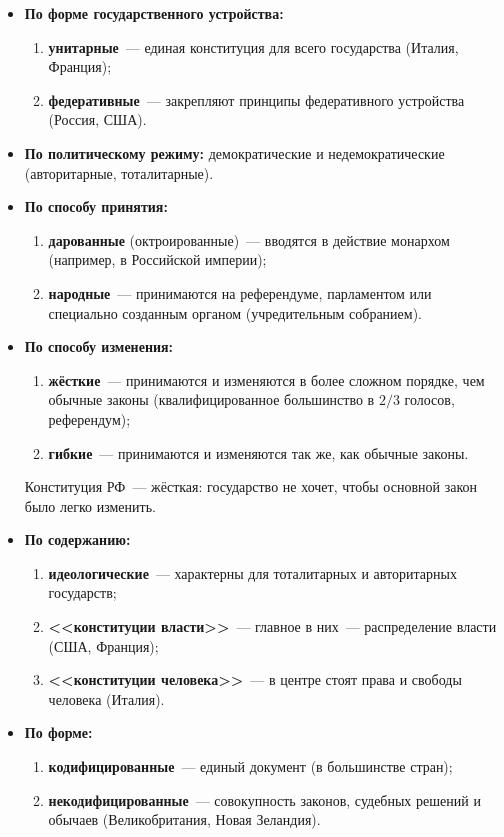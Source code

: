\documentclass[12pt]{article}
\begin{document}
	\begin{itemize}
		\item \textbf{По форме государственного устройства:}
		\begin{enumerate}
			\item \textbf{унитарные}~--- единая конституция для всего государства (Италия, Франция);
			\item \textbf{федеративные}~--- закрепляют принципы федеративного устройства (Россия, США).
		\end{enumerate}
		\item \textbf{По политическому режиму:} демократические и недемократические (авторитарные, тоталитарные).
		\item \textbf{По способу принятия:}
		\begin{enumerate}
			\item \textbf{дарованные} (октроированные)~--- вводятся в действие монархом (например, в Российской империи);
			\item \textbf{народные}~--- принимаются на референдуме, парламентом или специально созданным органом (учредительным собранием).
		\end{enumerate}
		\item \textbf{По способу изменения:}
		\begin{enumerate}
			\item \textbf{жёсткие}~--- принимаются и изменяются в более сложном порядке, чем обычные законы (квалифицированное большинство в $2/3$ голосов, референдум);
			\item \textbf{гибкие}~--- принимаются и изменяются так же, как обычные законы.
		\end{enumerate}
		Конституция РФ~--- жёсткая: государство не хочет, чтобы основной закон было легко изменить.
		\item \textbf{По содержанию:}
		\begin{enumerate}
			\item \textbf{идеологические}~--- характерны для тоталитарных и авторитарных государств;
			\item \textbf{<<конституции власти>>}~--- главное в них~--- распределение власти (США, Франция);
			\item \textbf{<<конституции человека>>}~--- в центре стоят права и свободы человека (Италия).
		\end{enumerate}
		\item \textbf{По форме:}
		\begin{enumerate}
			\item \textbf{кодифицированные}~--- единый документ (в большинстве стран);
			\item \textbf{некодифицированные}~--- совокупность законов, судебных решений и обычаев (Великобритания, Новая Зеландия).
		\end{enumerate}
	\end{itemize}
	
\end{document}
